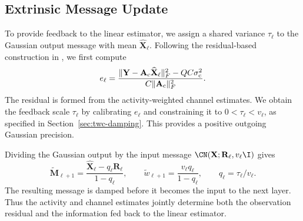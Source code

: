 \subsection{Extrinsic Message Update}

To provide feedback to the linear estimator, we assign a shared
variance $\tau_\ell$ to the Gaussian output message with mean
$\widehat{\mathbf X}_\ell$. Following the residual-based construction
in \cite[eq.~(12)]{wei2026}, we first compute
\begin{equation}
 e_\ell=\frac{\|\mathbf Y-\mathbf A_{\rm c}\widehat{\mathbf X}_\ell\|_F^2
                   -QC\sigma_{\rm c}^2}
                  {C\|\mathbf A_{\rm c}\|_F^2}.
 \label{eq:twc-residual-scale}
\end{equation}
The residual is formed from the activity-weighted channel estimates.
We obtain the feedback scale $\tau_\ell$ by calibrating $e_\ell$
and constraining it to $0<\tau_\ell<v_\ell$, as specified in
Section~\ref{sec:twc-damping}. This provides a positive outgoing
Gaussian precision.

Dividing the Gaussian output by the input message
$\CN(\mathbf X;\mathbf R_\ell,v_\ell\I)$ gives
\begin{equation}
 \widetilde{\mathbf M}_{\ell+1}
 =\frac{\widehat{\mathbf X}_\ell-q_\ell\mathbf R_\ell}{1-q_\ell},
 \qquad
 \widetilde w_{\ell+1}=\frac{v_\ell q_\ell}{1-q_\ell},
 \qquad q_\ell=\tau_\ell/v_\ell.
 \label{eq:twc-feedback-proposal}
\end{equation}
The resulting message is damped before it becomes the input to the
next layer. Thus the activity and channel estimates jointly determine
both the observation residual and the information fed back to the
linear estimator.

